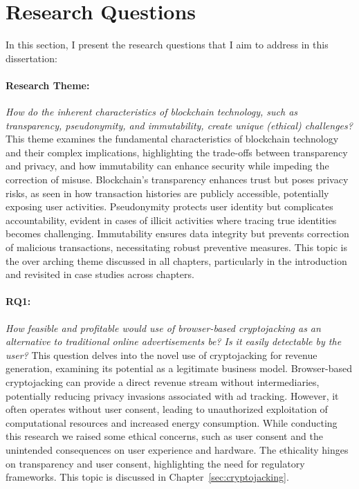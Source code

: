 \section{Research Questions}\label{sec:research_questions}
In this section, I present the research questions that I aim to address in this dissertation:

\paragraph{Research Theme:} \textit{How do the inherent characteristics of blockchain technology, such as transparency, pseudonymity, and immutability, create unique (ethical) challenges?} 
This theme examines the fundamental characteristics of blockchain technology and their complex implications, highlighting the trade-offs between transparency and privacy, and how immutability can enhance security while impeding the correction of misuse. Blockchain's transparency enhances trust but poses privacy risks, as seen in how transaction histories are publicly accessible, potentially exposing user activities. Pseudonymity protects user identity but complicates accountability, evident in cases of illicit activities where tracing true identities becomes challenging. Immutability ensures data integrity but prevents correction of malicious transactions, necessitating robust preventive measures. This topic is the over arching theme discussed in all chapters, particularly in the introduction and revisited in case studies across chapters.

\paragraph{RQ1:} \textit{How feasible and profitable would use of browser-based cryptojacking as an alternative to traditional online advertisements be? Is it easily detectable by the user?}
This question delves into the novel use of cryptojacking for revenue generation, examining its potential as a legitimate business model. Browser-based cryptojacking can provide a direct revenue stream without intermediaries, potentially reducing privacy invasions associated with ad tracking. However, it often operates without user consent, leading to unauthorized exploitation of computational resources and increased energy consumption. While conducting this research we raised some ethical concerns, such as user consent and the unintended consequences on user experience and hardware. The ethicality hinges on transparency and user consent, highlighting the need for regulatory frameworks. This topic is discussed in Chapter~\ref{sec:cryptojacking}. 

